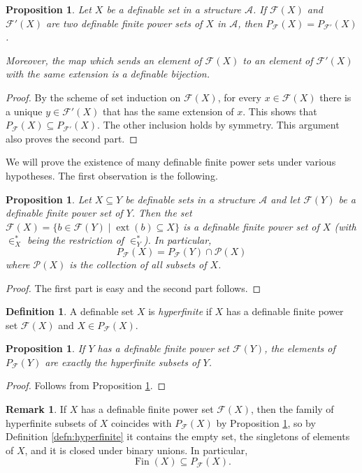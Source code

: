 \documentclass{amsart}
\newcommand{\ca}{\mathcal}
\newcommand{\Fin}{\operatorname{Fin}}
\theoremstyle{plain}
\newtheorem{prop}[thm]{Proposition}
\theoremstyle{definition}
\newtheorem{rem}[thm]{Remark}
\newtheorem{defn}[thm]{Definition}
\newcommand{\ins}{\in^*}
\newcommand{\F}{\mathcal{F}}
\newcommand{\pF}{P_{\ca F}}
\newcommand{\ext}[1]{\operatorname{ext}(#1)}
\begin{document}
\begin{prop} \label{cor:up to iso} Let $X$ be a definable set in a structure $\ca A$. 
If $\F(X)$ and $\F ' (X)$ are two definable finite power sets of $X$ in $\ca A$, then $\pF(X) = P_{\F'}(X)$. 

Moreover, the map which sends an element of $\F(X)$ to an element of $\F'(X)$ with the same extension is a definable bijection.
\end{prop}
\begin{proof}
    By the scheme of set induction on $\F (X)$, for every $x\in \F(X)$ there is a unique $y\in \F'(X)$ that has the same extension of $x$. This shows that $P_{\F}(X) \subseteq P_{\F'}(X)$. The other inclusion holds by symmetry. This argument also proves the second part.
\end{proof}
We will prove the existence of many definable finite power sets under various hypotheses. The first observation is the following.
\begin{prop}
\label{rem:robust} 
Let $X\subseteq Y$ be definable sets in a structure $\ca A$ and let $\F(Y)$ be a definable finite power set of $Y$. Then the set $\F(X) = \{b \in \F(Y) \mid \ext b \subseteq X\}$ is a definable finite power set of $X$ (with $\ins_X$ being the restriction of $\ins_Y$). In particular, \[\pF(X) = P_{\ca F}(Y) \cap \ca P(X)\] where $\ca P(X)$ is the collection of all subsets of $X$.
\end{prop}

\begin{proof}
    The first part is easy and the second part follows. 
\end{proof}

\begin{defn}
A definable set $X$ is {\em hyperfinite} if $X$ has a definable finite power set $\F(X)$ and $X \in \pF(X)$.
\end{defn}

 
\begin{prop}\label{prop:characetrize-hyperfinite}
If $Y$ has a definable finite power set $\F(Y)$, the elements of $\pF(Y)$ are exactly the hyperfinite subsets of $Y$.
\end{prop}

\begin{proof}
    Follows from Proposition \ref{rem:robust}.
\end{proof}

\begin{rem}
If $X$ has a definable finite power set $\F (X)$, then the family of hyperfinite subsets of $X$ coincides with $\pF(X)$ by Proposition \ref{prop:characetrize-hyperfinite}, so by Definition \ref{defn:hyperfinite} it contains the empty set, the singletons of elements of $X$, and it is closed under binary unions. In particular,
%
$$\Fin(X) \subseteq \pF(X).$$
%
\end{rem}
\end{document}
